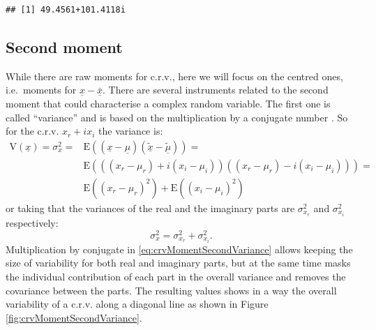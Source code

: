 \documentclass[
]{book}
\begin{document}
\begin{verbatim}
## [1] 49.4561+101.4118i
\end{verbatim}

\hypertarget{crvSecondMoment}{%
\subsection{Second moment}\label{crvSecondMoment}}

While there are raw moments for c.r.v., here we will focus on the centred ones, i.e.~moments for \(\underline{x}-\bar{\underline{x}}\). There are several instruments related to the second moment that could characterise a complex random variable. The first one is called ``variance'' and is based on the multiplication by a conjugate number \citep{reference}. So for the c.r.v. \(x_r + i x_i\) the variance is:
\begin{equation}
    \begin{aligned}
    \mathrm{V}(\underline{x}) = \sigma_x^2 = & \mathrm{E}((\underline{x}-\underline{\mu}) (\tilde{\underline{x}}-\tilde{\underline{\mu}})) = \\
                 & \mathrm{E}\left(((x_r-\mu_{r}) + i (x_i-\mu_{i}))((x_r-\mu_{r}) - i (x_i-\mu_{i}))\right) = \\
                 & \mathrm{E}((x_r-\mu_{r})^2) +  \mathrm{E}((x_i-\mu_{i})^2)
    \end{aligned}
    \label{eq:crvMomentSecondVariance}
\end{equation}
or taking that the variances of the real and the imaginary parts are \(\sigma_{x_r}^2\) and \(\sigma_{x_i}^2\) respectively:
\begin{equation}
    \sigma_x^2 = \sigma_{x_r}^2 + \sigma_{x_i}^2.
    \label{eq:crvMomentSecondVarianceShort}
\end{equation}
Multiplication by conjugate in \eqref{eq:crvMomentSecondVariance} allows keeping the size of variability for both real and imaginary parts, but at the same time masks the individual contribution of each part in the overall variance and removes the covariance between the parts. The resulting values shows in a way the overall variability of a c.r.v. along a diagonal line as shown in Figure \ref{fig:crvMomentSecondVariance}.
\end{document}
